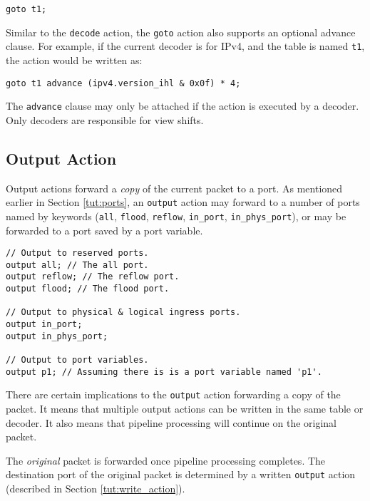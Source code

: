 \begin{lstlisting}
goto t1;
\end{lstlisting}

Similar to the \texttt{decode} action, the \texttt{goto} action also supports an
optional advance clause. For example, if the current decoder is for IPv4, and
the table is named \texttt{t1}, the action would be written as:

\begin{lstlisting}
goto t1 advance (ipv4.version_ihl & 0x0f) * 4;
\end{lstlisting}

The \texttt{advance} clause may only be attached if the action is executed by a
decoder. Only decoders are responsible for view shifts.

\subsection{Output Action} \label{tut:output_action}

Output actions forward a \textit{copy} of the current packet to a port. As
mentioned earlier in Section \ref{tut:ports}, an \texttt{output} action may forward to a
number of ports named by keywords (\texttt{all}, \texttt{flood},
\texttt{reflow}, \texttt{in\_port}, \texttt{in\_phys\_port}), or may be
forwarded to a port saved by a port variable.

\begin{codepage}
\begin{lstlisting}
// Output to reserved ports.
output all; // The all port.
output reflow; // The reflow port.
output flood; // The flood port.

// Output to physical & logical ingress ports.
output in_port;
output in_phys_port;

// Output to port variables.
output p1; // Assuming there is is a port variable named 'p1'.
\end{lstlisting}
\end{codepage}

There are certain implications to the \texttt{output} action forwarding a copy of the packet. 
It means that multiple output actions can be written in
the same table or decoder. It also means that pipeline processing will continue
on the original packet.

The \textit{original} packet is forwarded once pipeline processing completes.
The destination port of the original packet is determined by a written \texttt{output}
action (described in Section \ref{tut:write_action}).

